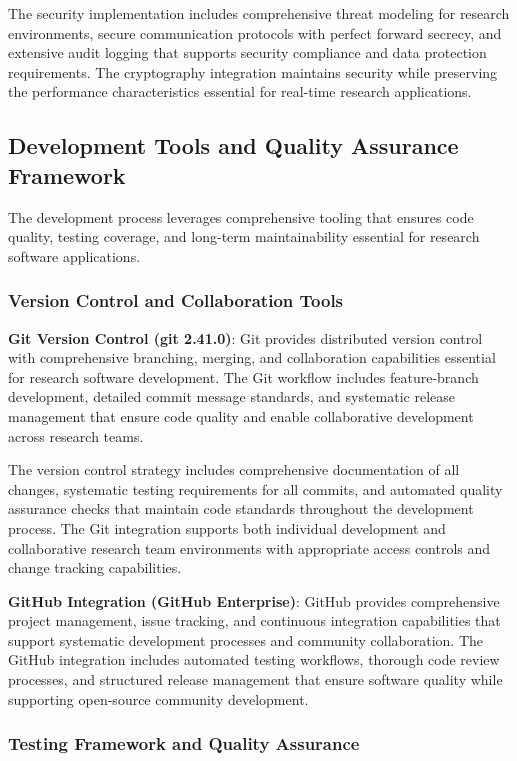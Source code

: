 \documentclass[11pt,a4paper]{report}
\begin{document}
The security implementation includes comprehensive threat modeling for research environments, secure communication protocols with perfect forward secrecy, and extensive audit logging that supports security compliance and data protection requirements. The cryptography integration maintains security while preserving the performance characteristics essential for real-time research applications.

\subsection{Development Tools and Quality Assurance Framework}

The development process leverages comprehensive tooling that ensures code quality, testing coverage, and long-term maintainability essential for research software applications.

\subsubsection{Version Control and Collaboration Tools}

\noindent \textbf{Git Version Control (git 2.41.0)}: Git provides distributed version control with comprehensive branching, merging, and collaboration capabilities essential for research software development. The Git workflow includes feature-branch development, detailed commit message standards, and systematic release management that ensure code quality and enable collaborative development across research teams.

The version control strategy includes comprehensive documentation of all changes, systematic testing requirements for all commits, and automated quality assurance checks that maintain code standards throughout the development process. The Git integration supports both individual development and collaborative research team environments with appropriate access controls and change tracking capabilities.

\noindent \textbf{GitHub Integration (GitHub Enterprise)}: GitHub provides comprehensive project management, issue tracking, and continuous integration capabilities that support systematic development processes and community collaboration. The GitHub integration includes automated testing workflows, thorough code review processes, and structured release management that ensure software quality while supporting open-source community development.

\subsubsection{Testing Framework and Quality Assurance}
\end{document}
